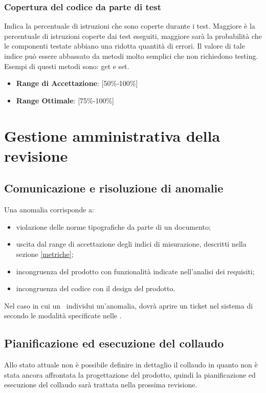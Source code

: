 \documentclass[12pt,a4paper]{article}
\begin{document}
\subsubsection{Copertura del codice da parte di test}
Indica la percentuale di istruzioni che sono coperte durante i test. Maggiore è la percentuale di istruzioni coperte dai test eseguiti, maggiore sarà la probabilità che le componenti testate abbiano una ridotta quantità di errori. Il valore di tale indice può essere abbassato da metodi molto semplici che non richiedono testing. Esempi di questi metodi sono: get e set.
\begin{itemize}
\item \textbf{Range di Accettazione}: [50\%-100\%]
\item \textbf{Range Ottimale}: [75\%-100\%]
\end{itemize}

\newpage
\section{Gestione amministrativa della revisione}
\subsection{Comunicazione e risoluzione di anomalie}
Una anomalia corrisponde a:
\begin{itemize}
\item violazione delle norme tipografiche da parte di un documento;
\item uscita dal range di accettazione degli indici di misurazione, descritti nella sezione \ref{metriche};
\item incongruenza del prodotto con funzionalità indicate nell'analisi dei requisiti;
\item incongruenza del codice con il design del prodotto.
\end{itemize}
Nel caso in cui un \VR\ individui un'anomalia, dovrà aprire un ticket nel sistema di  secondo le modalità specificate nelle \NdP.
\subsection{Pianificazione ed esecuzione del collaudo}
Allo stato attuale non è possibile definire in dettaglio il collaudo in quanto non è stata ancora affrontata la progettazione del prodotto, quindi la pianificazione ed esecuzione del collaudo sarà trattata nella prossima revisione.

\newpage
\appendix
\end{document}
